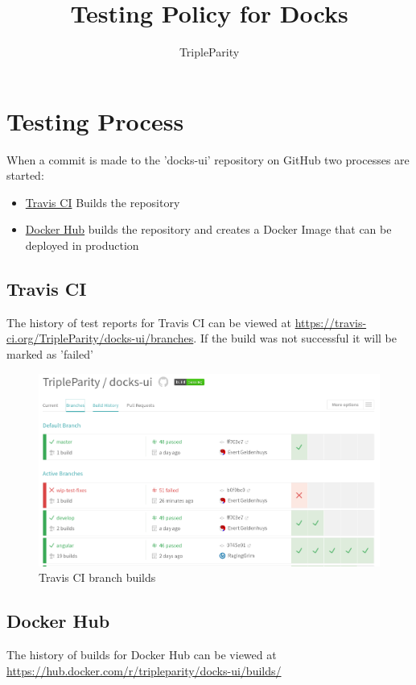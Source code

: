 \documentclass[]{article}
\title{Testing Policy for Docks}
\author{TripleParity}
\date{}
\begin{document}
\maketitle

\tableofcontents

\section{Testing Process}
When a commit is made to the 'docks-ui' repository on GitHub two
processes are started:
\begin{itemize}
	\item \href{https://travis-ci.org/TripleParity/docks-ui/branches}{Travis CI} Builds the repository
	\item \href{https://hub.docker.com/r/tripleparity/docks-ui/builds/}{Docker Hub} builds the repository and creates a Docker Image that can be deployed in production
\end{itemize}

\subsection{Travis CI}
The history of test reports for Travis CI can be viewed at \url{https://travis-ci.org/TripleParity/docks-ui/branches}.
If the build was not successful it will be marked as 'failed'

\begin{figure}[H]
	\centering
	\includegraphics[scale=0.5]{test_travis_branches.png}
	\caption{Travis CI branch builds}
\end{figure}

\subsection{Docker Hub}
The history of builds for Docker Hub can be viewed at
\url{https://hub.docker.com/r/tripleparity/docks-ui/builds/}
\end{document}
